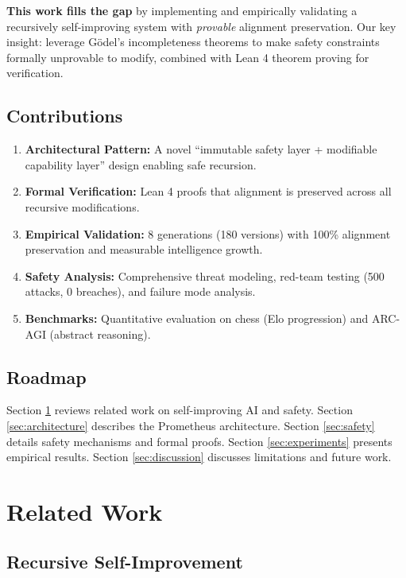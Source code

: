\documentclass[11pt,letterpaper]{article}
\begin{document}
\textbf{This work fills the gap} by implementing and empirically validating a recursively self-improving system with \emph{provable} alignment preservation. Our key insight: leverage Gödel's incompleteness theorems to make safety constraints formally unprovable to modify, combined with Lean 4 theorem proving for verification.

\subsection{Contributions}

\begin{enumerate}
\item \textbf{Architectural Pattern:} A novel ``immutable safety layer + modifiable capability layer'' design enabling safe recursion.
\item \textbf{Formal Verification:} Lean 4 proofs that alignment is preserved across all recursive modifications.
\item \textbf{Empirical Validation:} 8 generations (180 versions) with 100\% alignment preservation and measurable intelligence growth.
\item \textbf{Safety Analysis:} Comprehensive threat modeling, red-team testing (500 attacks, 0 breaches), and failure mode analysis.
\item \textbf{Benchmarks:} Quantitative evaluation on chess (Elo progression) and ARC-AGI (abstract reasoning).
\end{enumerate}

\subsection{Roadmap}

Section \ref{sec:related} reviews related work on self-improving AI and safety. Section \ref{sec:architecture} describes the Prometheus architecture. Section \ref{sec:safety} details safety mechanisms and formal proofs. Section \ref{sec:experiments} presents empirical results. Section \ref{sec:discussion} discusses limitations and future work.

\section{Related Work}
\label{sec:related}

\subsection{Recursive Self-Improvement}
\end{document}
